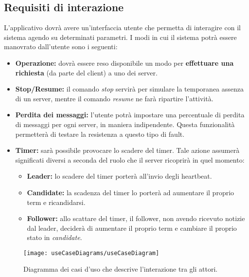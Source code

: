 	\subsection{Requisiti di interazione}
	L'applicativo dovrà avere un'interfaccia utente che permetta di interagire con il sistema agendo su determinati parametri. I modi in cui il sistema potrà essere manovrato dall'utente sono i seguenti:
		\begin{itemize}
			\item \textbf{Operazione:} dovrà essere reso disponibile un modo per \textbf{effettuare una richiesta} (da parte del client) a uno dei server.
			\item \textbf{Stop/Resume:} il comando \textit{stop} servirà per simulare la temporanea assenza di un server, mentre il comando \textit{resume} ne farà ripartire l'attività. 
			\item \textbf{Perdita dei messaggi:} l'utente potrà impostare una percentuale di perdita di messaggi per ogni server, in maniera indipendente. Questa funzionalità permetterà di testare la resistenza a questo tipo di fault.
			\item \textbf{Timer:} sarà possibile provocare lo scadere del timer. Tale azione assumerà significati diversi a seconda del ruolo che il server ricoprirà in quel momento:
				\begin{itemize}
					\item \textbf{Leader:} lo scadere del timer porterà all'invio degli heartbeat.
					\item \textbf{Candidate:} la scadenza del timer lo porterà ad aumentare il proprio term e ricandidarsi.
					\item \textbf{Follower:} allo scattare del timer, il follower, non avendo ricevuto notizie dal leader, deciderà di aumentare il proprio term e cambiare il proprio stato in \textit{candidate}.
				\end{itemize}

		\end{itemize}


\begin{figure}[H]
  \centering
  \texttt{[image: useCaseDiagrams/useCaseDiagram]}
  \caption[useCaseDiagramCaption]{Diagramma dei casi d'uso che descrive l'interazione tra gli attori.}
  
  \label{fig:figure28}
\end{figure}